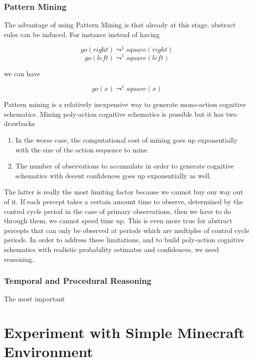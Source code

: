 \documentclass[runningheads]{llncs}
\newcommand{\lpreimp}[1]{\leadsto^{#1}}
\newcommand{\lgo}[1]{\textit{go}(#1)}
\begin{document}
\subsubsection{Pattern Mining}

The advantage of using Pattern Mining is that already at this stage,
abstract rules can be induced.  For instance instead of having

$$\lgo{\textit{right}} \lpreimp{1} square(right)$$
$$go(left) \lpreimp{1} square(left)$$

we can have

$$\lgo{x} \lpreimp{1} square(x)$$

Pattern mining is a relatively inexpensive way to generate mono-action
cognitive schematics.  Mining poly-action cognitive schematics is
possible but it has two drawbacks
\begin{enumerate}
\item In the worse case, the computational cost of mining goes up
  exponentially with the size of the action sequence to mine.
\item The number of observations to accumulate in order to generate
  cognitive schematics with decent confidences goes up exponentially
  as well.
\end{enumerate}
The latter is really the most limiting factor because we cannot buy
our way out of it.  If each percept takes a certain amount time to
observe, determined by the control cycle period in the case of primary
observations, then we have to do through them, we cannot speed time
up.  This is even more true for abstract percepts that can only be
observed at periods which are multiples of control cycle periods.  In
order to address these limitations, and to build poly-action cognitive
schematics with realistic probability estimates and confidences, we
need reasoning.

\subsubsection{Temporal and Procedural Reasoning}

The most important

\section{Experiment with Simple Minecraft Environment}
\end{document}
